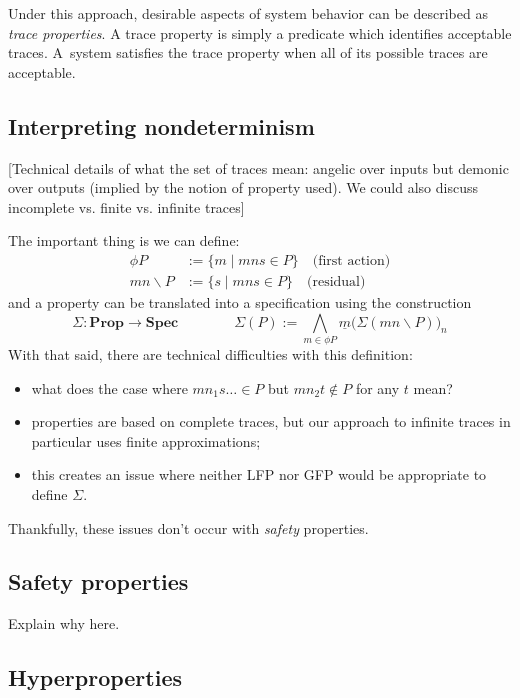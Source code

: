 \documentclass[11pt]{article}
\begin{document}
Under this approach,
desirable aspects of system behavior
can be described as \emph{trace properties}.
A trace property is simply a predicate which identifies
acceptable traces.
A~system satisfies the trace property when
all of its possible traces are acceptable.


\subsection{Interpreting nondeterminism} %

[Technical details of what the set of traces mean:
angelic over inputs but
demonic over outputs (implied by the notion of property used).
We could also discuss incomplete vs. finite vs. infinite traces]

The important thing is we can define:
\begin{align*}
  \phi P &:= \{ m \mid mns \in P \}  \quad \text{(first action)} \\
  mn \backslash P &:= \{ s \mid mns \in P \} \quad \text{(residual)}
\end{align*}
and a property can be translated into a specification
using the construction
\[
  \Sigma : \mathbf{Prop} \rightarrow \mathbf{Spec}
  \qquad \qquad
  \Sigma(P) := \bigwedge_{m \in \phi P}
    \underline{m} \big( \Sigma(mn \backslash P) \big)_n
\]
With that said,
there are technical difficulties with this definition:
\begin{itemize}
  \item what does the case where $m n_1 s \ldots \in P$ but
    $m n_2 t \notin P$ for any $t$ mean?
  \item properties are based on complete traces,
    but our approach to infinite traces in particular
    uses finite approximations;
  \item this creates an issue where neither LFP nor GFP
    would be appropriate to define $\Sigma$.
\end{itemize}
Thankfully, these issues don't occur with \emph{safety} properties.


\subsection{Safety properties} %

Explain why here.


\subsection{Hyperproperties} %
\end{document}
